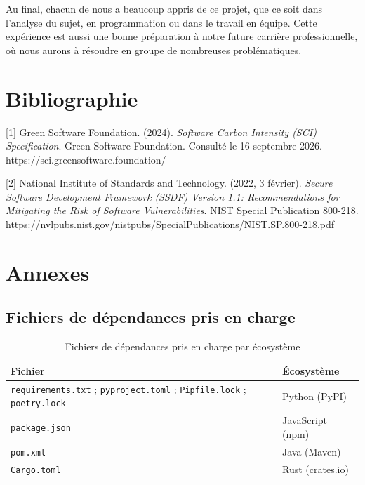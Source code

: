 \documentclass[a4paper,12pt]{article}
\begin{document}
Au final, chacun de nous a beaucoup appris de ce projet, que ce soit
dans l'analyse du sujet, en programmation ou dans le travail en équipe.
Cette expérience est aussi une bonne préparation à notre future carrière
professionnelle, où nous aurons à résoudre en groupe de nombreuses
problématiques.

\newpage{}

\section*{Bibliographie}\label{bibliographie}

{[}1{]} Green Software Foundation. (2024). \emph{Software Carbon
Intensity (SCI) Specification}. Green Software Foundation. Consulté le
16 septembre 2026. https://sci.greensoftware.foundation/

{[}2{]} National Institute of Standards and Technology. (2022, 3
février). \emph{Secure Software Development Framework (SSDF) Version
1.1: Recommendations for Mitigating the Risk of Software
Vulnerabilities}. NIST Special Publication 800-218.
https://nvlpubs.nist.gov/nistpubs/SpecialPublications/NIST.SP.800-218.pdf

\newpage{}

\section*{Annexes}\label{annexes}

\subsection*{Fichiers de dépendances pris en
charge}\label{fichiers-de-duxe9pendances-pris-en-charge}

\appendix
\begin{table}[H]
\centering
\small
\renewcommand{\arraystretch}{1.5}
\setlength{\tabcolsep}{6pt}
\begin{tabular}{
    >{\raggedright\arraybackslash}p{}
    >{\raggedright\arraybackslash}p{}
}
\toprule
\textbf{Fichier} & \textbf{Écosystème} \\
\midrule
\texttt{requirements.txt} ; \texttt{pyproject.toml} ; \texttt{Pipfile.lock} ; \texttt{poetry.lock} & Python (PyPI) \\
\midrule
\texttt{package.json} & JavaScript (npm) \\
\midrule
\texttt{pom.xml} & Java (Maven) \\
\midrule
\texttt{Cargo.toml} & Rust (crates.io) \\
\bottomrule
\end{tabular}

\caption{Fichiers de dépendances pris en charge par écosystème}
\label{tab:fichiers-ecosystemes}
\end{table}
\end{document}
